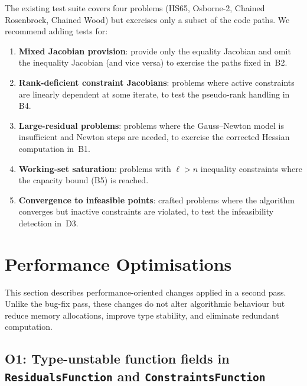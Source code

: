 \documentclass[11pt, a4paper]{article}
\begin{document}
The existing test suite covers four problems (HS65, Osborne-2, Chained
Rosenbrock, Chained Wood) but exercises only a subset of the code paths.
We recommend adding tests for:

\begin{enumerate}[nosep]
  \item \textbf{Mixed Jacobian provision}: provide only the equality
        Jacobian and omit the inequality Jacobian (and vice versa) to
        exercise the paths fixed in~B2.
  \item \textbf{Rank-deficient constraint Jacobians}: problems where
        active constraints are linearly dependent at some iterate, to
        test the pseudo-rank handling in B4.
  \item \textbf{Large-residual problems}: problems where the
        Gauss--Newton model is insufficient and Newton steps are needed,
        to exercise the corrected Hessian computation in~B1.
  \item \textbf{Working-set saturation}: problems with $\ell > n$
        inequality constraints where the capacity bound (B5) is reached.
  \item \textbf{Convergence to infeasible points}: crafted problems
        where the algorithm converges but inactive constraints are
        violated, to test the infeasibility detection in~D3.
\end{enumerate}

\section{Performance Optimisations}
\label{sec:optim}

This section describes performance-oriented changes applied in a second
pass.  Unlike the bug-fix pass, these changes do not alter algorithmic
behaviour but reduce memory allocations, improve type stability, and
eliminate redundant computation.

\subsection{O1: Type-unstable function fields in \texttt{ResidualsFunction}
  and \texttt{ConstraintsFunction}}
\label{sec:o1}
\end{document}
